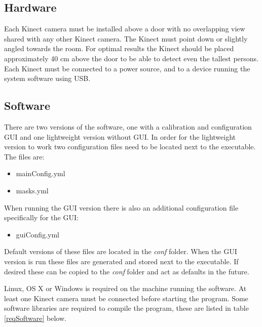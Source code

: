 \subsection{Hardware}
Each Kinect camera must be installed above a door with no overlapping view shared with any other Kinect camera. The Kinect must point down or slightly angled towards the room. For optimal results the Kinect should be placed approximately 40 cm above the door to be able to detect even the tallest persons. Each Kinect must be connected to a power source, and to a device running the system software using USB.

\subsection{Software}
There are two versions of the software, one with a calibration and configuration GUI and one lightweight version without GUI. In order for the lightweight version to work two configuration files need to be located next to the executable. The files are:

\begin{itemize}
\item mainConfig.yml
\item masks.yml
\end{itemize}

When running the GUI version there is also an additional configuration file specifically for the GUI:

\begin{itemize}
\item guiConfig.yml
\end{itemize}

Default versions of these files are located in the \textit{conf} folder. When the GUI version is run these files are generated and stored next to the executable. If desired these can be copied to the \textit{conf} folder and act as defaults in the future.

Linux, OS X or Windows is required on the machine running the software. At least one Kinect camera must be connected before starting the program. Some software libraries are required to compile the program, these are listed in table \ref{reqSoftware} below. \\


